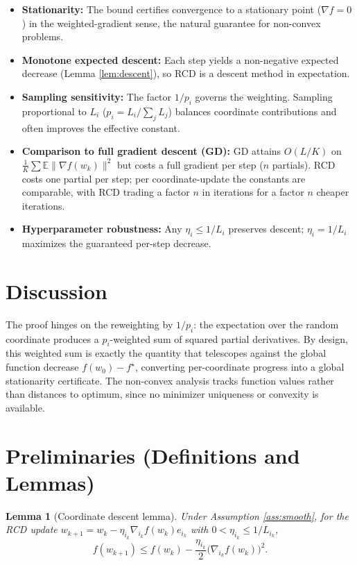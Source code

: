 \documentclass{article}
\newtheorem{lemma}{Lemma}
\begin{document}
\begin{itemize}
\item \textbf{Stationarity:} The bound certifies convergence to a stationary point
($\nabla f = 0$) in the weighted-gradient sense, the natural guarantee for
non-convex problems.
\item \textbf{Monotone expected descent:} Each step yields a non-negative expected
decrease (Lemma \ref{lem:descent}), so RCD is a descent method in expectation.
\item \textbf{Sampling sensitivity:} The factor $1/p_i$ governs the weighting. Sampling
proportional to $L_i$ ($p_i = L_i/\sum_j L_j$) balances coordinate contributions
and often improves the effective constant.
\item \textbf{Comparison to full gradient descent (GD):} GD attains
$O(L/K)$ on $\frac1K\sum \mathbb E\|\nabla f(w_k)\|^2$ but costs a full gradient per
step ($n$ partials). RCD costs one partial per step; per coordinate-update the
constants are comparable, with RCD trading a factor $n$ in iterations for a factor
$n$ cheaper iterations.
\item \textbf{Hyperparameter robustness:} Any $\eta_i \le 1/L_i$ preserves descent;
$\eta_i = 1/L_i$ maximizes the guaranteed per-step decrease.
\end{itemize}

\section*{Discussion}

The proof hinges on the reweighting by $1/p_i$: the expectation over the random
coordinate produces a $p_i$-weighted sum of squared partial derivatives. By design,
this weighted sum is exactly the quantity that telescopes against the global function
decrease $f(w_0)-f^\star$, converting per-coordinate progress into a global
stationarity certificate. The non-convex analysis tracks function values rather than
distances to optimum, since no minimizer uniqueness or convexity is available.

\section*{Preliminaries (Definitions and Lemmas)}

\begin{lemma}[Coordinate descent lemma]
\label{lem:cdl}
Under Assumption \ref{ass:smooth}, for the RCD update
$w_{k+1} = w_k - \eta_{i_k}\nabla_{i_k} f(w_k) e_{i_k}$ with $0 < \eta_{i_k} \le 1/L_{i_k}$,
\[
f(w_{k+1}) \le f(w_k) - \frac{\eta_{i_k}}{2}\big(\nabla_{i_k} f(w_k)\big)^2 .
\]
\end{lemma}
\end{document}
